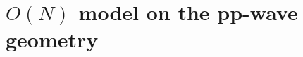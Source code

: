 \documentclass[a4paper,11pt]{article}
\begin{document}
%
%
%
%
\section{$O(N)$ model on the pp-wave geometry}
\label{sec:plane-wave}
\end{document}
